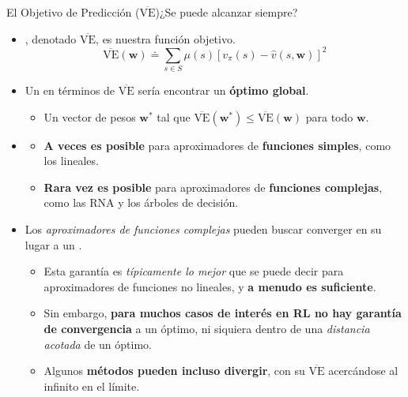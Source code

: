 \documentclass[10pt, envcountsect, handout, aspectratio=1610, hyperref={hypertexnames=true}]{beamer}
\begin{document}
\begin{frame}{El Objetivo de Predicción ($\overline{\text{VE}}$)}{¿Se puede alcanzar siempre?}
	\begin{itemize}
		\item {}, denotado $\overline{\text{VE}}$, es nuestra función objetivo.
		\[
		\overline{\text{VE}}(\mathbf{w}) \doteq \sum_{s \in S} \mu(s) \left[ v_\pi(s) - \hat{v}(s, \mathbf{w}) \right]^2
		\]
		
		\item Un  en términos de  $\overline{\text{VE}}$ sería encontrar un \textbf{óptimo global}.
		\begin{itemize}
			\item Un vector de pesos $\mathbf{w}^*$ tal que $\overline{\text{VE}}(\mathbf{w}^*) \leq \overline{\text{VE}}(\mathbf{w})$ para todo $\mathbf{w}$.
		\end{itemize}
		
		\item {}
		\begin{itemize}
			 \item \textbf{A veces es posible} para aproximadores de \textbf{funciones simples}, como los lineales. 
			 \item \textbf{Rara vez es posible} para aproximadores de \textbf{funciones complejas}, como las RNA y los árboles de decisión.
		\end{itemize}
		
		\item Los \textit{aproximadores de funciones complejas} pueden buscar converger en su lugar a un .
		\begin{itemize}
			\item Esta garantía es \textit{típicamente lo mejor} que se puede decir para aproximadores de funciones no lineales, y \textbf{a menudo es suficiente}.
			\item Sin embargo, \textbf{para muchos casos de interés en RL no hay garantía de convergencia} a un óptimo, ni siquiera dentro de una \textit{distancia acotada} de un óptimo.
			\item Algunos \textbf{métodos pueden incluso divergir}, con su $\overline{\text{VE}}$ acercándose al infinito en el límite.
		\end{itemize}
	\end{itemize}
\end{frame}
\end{document}

